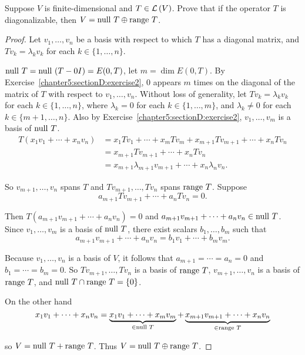 \begin{exercise}\label{chapter5:sectionD:exercise3}
    Suppose $V$ is finite-dimensional and $T \in \mathcal{L}\left({V}\right)$. Prove that if the operator $T$ is diagonalizable, then $V = \operatorname{null}\,{T}\oplus\operatorname{range}\,{T}$.
\end{exercise}

\begin{proof}
    Let $v_{1}, \ldots, v_{n}$ be a basis with respect to which $T$ has a diagonal matrix, and $Tv_{k} = \lambda_{k}v_{k}$ for each $k\in \{ 1, \ldots, n \}$.

    $\operatorname{null}\,{T} = \operatorname{null}\,{(T - 0I)} = E(0, T)$, let $m = \dim E(0, T)$. By Exercise~\ref{chapter5:sectionD:exercise2}, $0$ appears $m$ times on the diagonal of the matrix of $T$ with respect to $v_{1}, \ldots, v_{n}$. Without loss of generality, let $Tv_{k} = \lambda_{k}v_{k}$ for each $k\in \{ 1, \ldots, n \}$, where $\lambda_{k} = 0$ for each $k\in\{ 1, \ldots, m \}$, and $\lambda_{k} \ne 0$ for each $k\in\{ m+1, \ldots, n \}$. Also by Exercise~\ref{chapter5:sectionD:exercise2}, $v_{1}, \ldots, v_{m}$ is a basis of $\operatorname{null}\,{T}$.
    \begin{align*}
        T(x_{1}v_{1} + \cdots + x_{n}v_{n}) & = x_{1}Tv_{1} + \cdots + x_{m}Tv_{m} + x_{m+1}Tv_{m+1} + \cdots + x_{n}Tv_{n} \\
                                            & = x_{m+1}Tv_{m+1} + \cdots + x_{n}Tv_{n}                                      \\
                                            & = x_{m+1}\lambda_{m+1}v_{m+1} + \cdots + x_{n}\lambda_{n}v_{n}.
    \end{align*}

    So $v_{m+1}, \ldots, v_{n}$ spans $T$ and $Tv_{m+1}, \ldots, Tv_{n}$ spans $\operatorname{range}\,{T}$. Suppose
    \[
        a_{m+1}Tv_{m+1} + \cdots + a_{n}Tv_{n} = 0.
    \]

    Then $T(a_{m+1}v_{m+1} + \cdots + a_{n}v_{n}) = 0$ and $a_{m+1}v_{m+1} + \cdots + a_{n}v_{n}\in\operatorname{null}\,{T}$. Since $v_{1}, \ldots, v_{m}$ is a basis of $\operatorname{null}\,{T}$, there exist scalars $b_{1}, \ldots, b_{m}$ such that
    \[
        a_{m+1}v_{m+1} + \cdots + a_{n}v_{n} = b_{1}v_{1} + \cdots + b_{m}v_{m}.
    \]

    Because $v_{1}, \ldots, v_{n}$ is a basis of $V$, it follows that $a_{m+1} = \cdots = a_{n} = 0$ and $b_{1} = \cdots = b_{m} = 0$. So $Tv_{m+1}, \ldots, Tv_{n}$ is a basis of $\operatorname{range}\,{T}$, $v_{m+1}, \ldots, v_{n}$ is a basis of $\operatorname{range}\,{T}$, and $\operatorname{null}\,{T}\cap\operatorname{range}\,{T} = \{0\}$.

    On the other hand
    \[
        x_{1}v_{1} + \cdots + x_{n}v_{n} = \underbrace{x_{1}v_{1} + \cdots + x_{m}v_{m}}_{\in\operatorname{null}\,{T}} + \underbrace{x_{m+1}v_{m+1} + \cdots + x_{n}v_{n}}_{\in\operatorname{range}\,{T}}
    \]

    so $V = \operatorname{null}\,{T} + \operatorname{range}\,{T}$. Thus $V = \operatorname{null}\,{T}\oplus\operatorname{range}\,{T}$.
\end{proof}
\newpage


